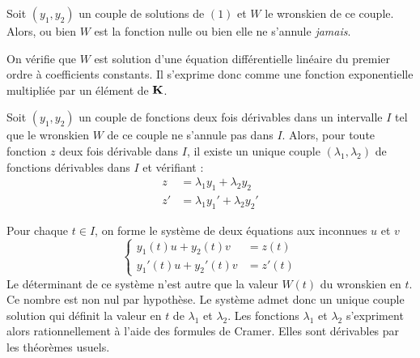 \begin{prop}[lemme 1]
 Soit $(y_1,y_2)$ un couple de solutions de $(1)$ et $W$ le wronskien de ce couple. Alors, ou bien $W$ est la fonction nulle ou bien elle ne s'annule \emph{jamais}.
\end{prop}
\begin{demo}
 On vérifie que $W$ est solution d'une équation différentielle linéaire du premier ordre à coefficients constants. Il s'exprime donc comme une fonction exponentielle multipliée par un élément de $\mathbf{K}$. 
\end{demo}
\begin{prop}
 Soit $(y_1,y_2)$ un couple de fonctions deux fois dérivables dans un intervalle $I$ tel que le wronskien $W$ de ce couple ne s'annule pas dans $I$. Alors, pour toute fonction $z$ deux fois dérivable dans $I$, il existe un unique couple $(\lambda_1,\lambda_2)$ de fonctions dérivables dans $I$ et vérifiant :
\begin{align*}
 z  &= \lambda_1 y_1 + \lambda_2 y_2  \\
 z' &= \lambda_1 y_1' + \lambda_2 y_2'
\end{align*}
\end{prop}
\begin{demo}
 Pour chaque $t\in I$, on forme le système de deux équations aux inconnues $u$ et $v$
\begin{displaymath}
 \left\lbrace 
\begin{aligned}
 y_1(t) u + y_2(t)v &= z(t) \\
 y_1'(t) u + y_2'(t)v &= z'(t) 
\end{aligned}
\right. 
\end{displaymath}
Le déterminant de ce système n'est autre que la valeur $W(t)$ du wronskien en $t$. Ce nombre est non nul par hypothèse. Le système admet donc un unique couple solution  qui définit la valeur en $t$ de $\lambda_1$ et $\lambda_2$. Les fonctions $\lambda_1$ et $\lambda_2$ s'expriment alors rationnellement à l'aide des formules de Cramer. Elles sont dérivables par les théorèmes usuels.
\end{demo}

